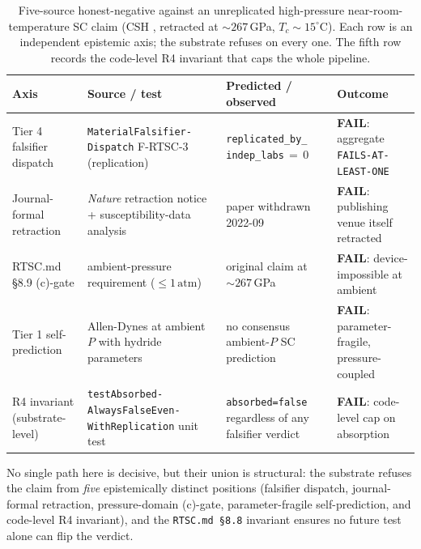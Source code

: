 \documentclass[11pt,a4paper]{article}
\begin{document}
\begin{table}[h]
\centering
\caption{Five-source honest-negative against an unreplicated
high-pressure near-room-temperature SC claim (CSH \cite{snider2020csh},
retracted \cite{snider2022retraction} at $\sim 267$\,GPa,
$T_c \sim 15^{\circ}$C). Each row is an independent epistemic axis;
the substrate refuses on every one. The fifth row records the
code-level R4 invariant that caps the whole pipeline.}
\label{tab:rtsc-neg}
\scriptsize
\renewcommand{\arraystretch}{1.25}
\begin{tabular}{@{}>{\raggedright\arraybackslash}p{2.5cm}
                  >{\raggedright\arraybackslash}p{4.6cm}
                  >{\raggedright\arraybackslash}p{3.4cm}
                  >{\raggedright\arraybackslash}p{3.8cm}@{}}
\toprule
\textbf{Axis} & \textbf{Source / test} & \textbf{Predicted / observed} & \textbf{Outcome} \\
\midrule
Tier 4 falsifier dispatch
  & \texttt{MaterialFalsifier-} \texttt{Dispatch} F-RTSC-3 (replication)
  & \texttt{replicated\_by\_} \texttt{indep\_labs}\,\(=\,0\)
  & \textcolor{honestred}{\textbf{FAIL}}: aggregate \texttt{FAILS-AT-} \texttt{LEAST-ONE} \\
Journal-formal retraction
  & \emph{Nature} retraction notice \cite{snider2022retraction} +
    susceptibility-data analysis \cite{hirsch2022csh}
  & paper withdrawn 2022-09
  & \textcolor{honestred}{\textbf{FAIL}}: publishing venue itself retracted \\
RTSC.md §8.9 (c)-gate
  & ambient-pressure requirement (\(\le 1\,\mathrm{atm}\))
  & original claim at $\sim 267$\,GPa
  & \textcolor{honestred}{\textbf{FAIL}}: device-impossible at ambient \\
Tier 1 self-prediction
  & Allen-Dynes at ambient \(P\) with hydride parameters
  & no consensus ambient-$P$ SC prediction
  & \textcolor{honestred}{\textbf{FAIL}}: parameter-fragile, pressure-coupled \\
R4 invariant (substrate-level)
  & \texttt{testAbsorbed-} \texttt{AlwaysFalseEven-} \texttt{WithReplication} unit test
  & \texttt{absorbed=false} regardless of any falsifier verdict
  & \textcolor{honestred}{\textbf{FAIL}}: code-level cap on absorption \\
\bottomrule
\end{tabular}
\end{table}

No single path here is decisive, but their union is structural: the
substrate refuses the claim from \emph{five} epistemically distinct
positions (falsifier dispatch, journal-formal retraction,
pressure-domain (c)-gate, parameter-fragile self-prediction, and
code-level R4 invariant), and the \texttt{RTSC.md \S 8.8} invariant
ensures no future test alone can flip the verdict.
\end{document}
